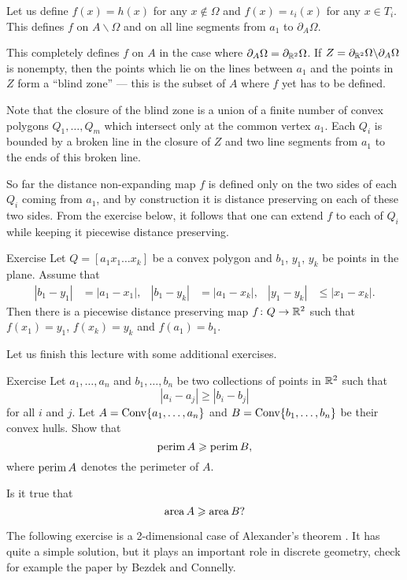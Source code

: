 Let us define 
$f(x)=h(x)$ for any $x\notin\Omega$
and $f(x)=\iota_i(x)$ for any $x\in T_i$.
This defines $f$ on $A\backslash \Omega$ 
and on all line segments from $a_1$ to $\partial_A\Omega$.

This completely defines $f$ on $A$ in the case where $\partial_{A}\Omega=\partial_{\mathbb{R}^2}\Omega$.
If $Z=\partial_{\mathbb{R}^2}\Omega\backslash\partial_{A}\Omega$ is nonempty, then the points which lie on the lines between $a_1$ and the points in $Z$ 
form a ``blind zone'' --- this is the subset of $A$ where $f$ yet has to be defined.

Note that the closure of the blind zone is a union of a finite number 
of convex polygons $Q_1,\dots, Q_m$ which intersect only at the common vertex $a_1$.
Each $Q_i$ is bounded by a broken line in the closure of $Z$ 
and two line segments from $a_1$ to the ends of this broken line. 

So far the distance non-expanding map $f$ 
is defined only on the two sides of each $Q_i$ coming from $a_1$, 
and by construction it is distance preserving on each of these two sides.
From the exercise below, it follows that
one can extend $f$ to each of $Q_i$ while keeping it piecewise distance preserving.
\qeds

\begin{thm}{Exercise}\label{ex:triangle-reflect}
Let $Q=[a_1x_1\dots x_k]$ be a convex polygon and $b_1$, $y_1$, $y_k$ be points in the plane.
Assume that 
\begin{align*}
|b_1-y_1|&=|a_1-x_1|,&
|b_1-y_k|&=|a_1-x_k|,&
|y_1-y_k|&\le|x_1-x_k|.
\end{align*}
Then there is a piecewise distance preserving map 
$f\colon Q\to \mathbb{R}^2$ such that $f(x_1)=y_1$, $f(x_k)= y_k$ and $f(a_1)= b_1$.
\end{thm}

Let us finish this lecture with some additional exercises.

\begin{thm}{Exercise}\label{pr:perimeter}
Let $a_1,\dots,a_n$ and $b_1,\dots,b_n$ be two collections of points in $\mathbb{R}^2$ such that 
$$|a_i-a_j|\ge |b_i-b_j|$$
for all $i$ and $j$.
Let $A=\operatorname{Conv}\{a_1,\dots,a_n\}$ 
and $B=\Conv\{b_1,\z\dots,b_n\}$ be their convex hulls.
Show that 
$$\operatorname{perim} A\geqslant \operatorname{perim} B,$$
where $\operatorname{perim} A$ denotes the perimeter of $A$.

Is it true that
$$\operatorname{area} A\geqslant \operatorname{area} B?$$

\end{thm}

The following exercise is a 2-dimensional case of Alexander's theorem
\cite{alexander}.
It has quite a simple solution,
but it plays an important role in discrete geometry,
check for example the paper \cite{bezdek-connelly} by Bezdek and Connelly.

